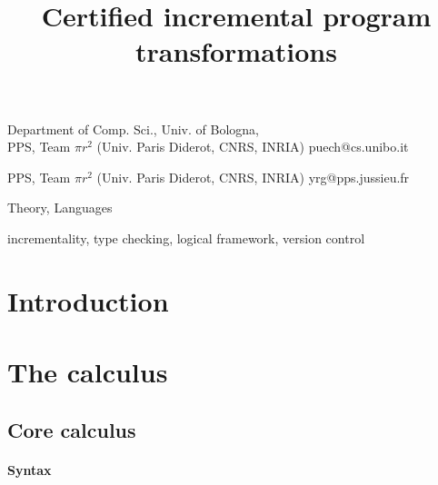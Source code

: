 \documentclass[9pt]{sigplanconf}
\begin{document}
\copyrightdata{[to be supplied]}


\title{Certified incremental program transformations}

           {Department of Comp. Sci., Univ. of Bologna,\\
             PPS, Team $\pi r^2$ (Univ. Paris Diderot, CNRS, INRIA)}
           {puech@cs.unibo.it}

           {PPS, Team $\pi r^2$ (Univ. Paris Diderot, CNRS, INRIA)}
           {yrg@pps.jussieu.fr}

\maketitle

\begin{abstract}
\end{abstract}

 

\terms
Theory, Languages

\keywords
incrementality, type checking, logical framework, version control


\section{Introduction}

\section{The calculus}

\subsection{Core calculus}

\paragraph{Syntax}
\end{document}
